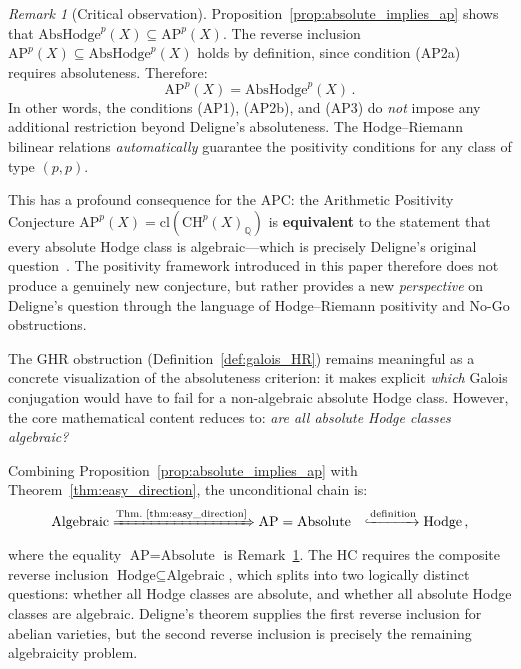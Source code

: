 \documentclass[aps,prd,twocolumn,superscriptaddress,nofootinbib]{revtex4-2}
\theoremstyle{definition}
\theoremstyle{remark}
\newtheorem{remark}[theorem]{Remark}
\def\\{ }%
\begin{document}
\begin{remark}[Critical observation]
\label{rem:ap_equals_absolute}
Proposition~\ref{prop:absolute_implies_ap} shows that $\mathrm{AbsHodge}^p(X) \subseteq \mathrm{AP}^p(X)$. The reverse inclusion $\mathrm{AP}^p(X) \subseteq \mathrm{AbsHodge}^p(X)$ holds by definition, since condition (AP2a) requires absoluteness. Therefore:
\begin{equation}
\mathrm{AP}^p(X) = \mathrm{AbsHodge}^p(X)\,.
\end{equation}
In other words, the conditions (AP1), (AP2b), and (AP3) do \textit{not} impose any additional restriction beyond Deligne's absoluteness. The Hodge--Riemann bilinear relations \textit{automatically} guarantee the positivity conditions for any class of type $(p,p)$.

This has a profound consequence for the APC: the Arithmetic Positivity Conjecture $\mathrm{AP}^p(X) = \mathrm{cl}(\mathrm{CH}^p(X)_\mathbb{Q})$ is \textbf{equivalent} to the statement that every absolute Hodge class is algebraic---which is precisely Deligne's original question~\cite{Deligne1982}. The positivity framework introduced in this paper therefore does not produce a genuinely new conjecture, but rather provides a new \textit{perspective} on Deligne's question through the language of Hodge--Riemann positivity and No-Go obstructions.

The GHR obstruction (Definition~\ref{def:galois_HR}) remains meaningful as a concrete visualization of the absoluteness criterion: it makes explicit \textit{which} Galois conjugation would have to fail for a non-algebraic absolute Hodge class. However, the core mathematical content reduces to: \textit{are all absolute Hodge classes algebraic?}
\end{remark}

Combining Proposition~\ref{prop:absolute_implies_ap} with Theorem~\ref{thm:easy_direction}, the unconditional chain is:
\begin{equation}
\begin{aligned}
\text{Algebraic}
&\xRightarrow{\text{Thm.~\ref{thm:easy_direction}}}
  \text{AP} = \text{Absolute}\\
&\xhookrightarrow{\text{definition}} \text{Hodge}\,,
\end{aligned}
\end{equation}
where the equality $\text{AP} = \text{Absolute}$ is Remark~\ref{rem:ap_equals_absolute}.  The HC requires the composite reverse inclusion $\text{Hodge}\subseteq\text{Algebraic}$, which splits into two logically distinct questions: whether all Hodge classes are absolute, and whether all absolute Hodge classes are algebraic.  Deligne's theorem supplies the first reverse inclusion for abelian varieties, but the second reverse inclusion is precisely the remaining algebraicity problem.
\end{document}
